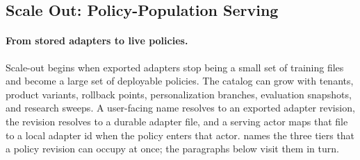 \subsection{Scale Out: Policy-Population Serving}
\label{sec:scale_out_residency}

\paragraph{From stored adapters to live policies.}
Scale-out begins when exported adapters stop being a small set of training files and become a large set of deployable policies. The catalog can grow with tenants, product variants, rollback points, personalization branches, evaluation snapshots, and research sweeps. A user-facing name resolves to an exported adapter revision, the revision resolves to a durable adapter file, and a serving actor maps that file to a local adapter id when the policy enters that actor.  names the three tiers that a policy revision can occupy at once; the paragraphs below visit them in turn.

\begin{table}[t]
\centering
\scriptsize
\setlength{\tabcolsep}{3.2pt}
\renewcommand{\arraystretch}{1.10}
\caption{Three cache tiers separate addressability from local residency and same-batch execution. A policy revision can occupy any subset of these tiers at a given moment; the scales, lifetimes, and control surfaces differ.}
\label{tab:scale_out_cache_tiers}
\end{table}

